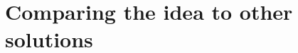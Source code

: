 \documentclass{article}
\begin{document}
%
%
%
%
%
%
%
%







\section{Comparing the idea to other solutions}
\end{document}
